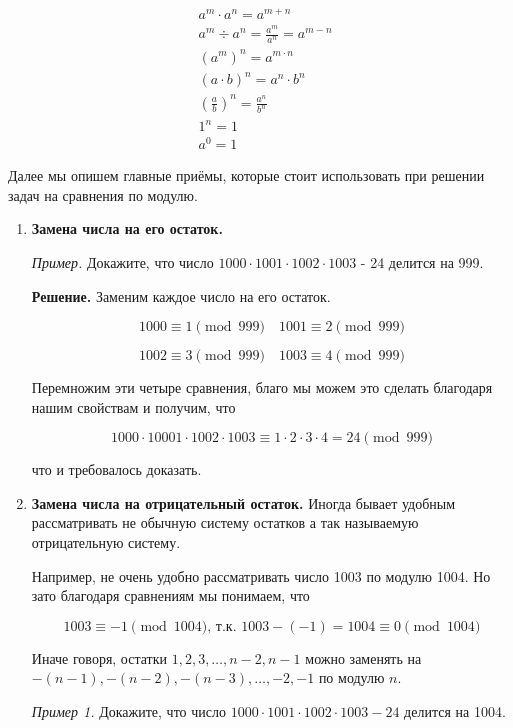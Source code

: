$$
\begin{aligned}
& a^m \cdot a^n=a^{m+n} \\
& a^m \div a^n=\frac{a^m}{a^n}=a^{m-n} \\
& \left(a^m\right)^n=a^{m \cdot n} \\
& (a \cdot b)^n=a^n \cdot b^n \\
& \left(\frac{a}{b}\right)^n=\frac{a^n}{b^n} \\
& 1^n=1 \\
& a^0=1
\end{aligned}
$$

Далее мы опишем главные приёмы, которые стоит использовать при решении задач на сравнения по модулю.

\begin{enumerate}
    \item \textbf{Замена числа на его остаток.}
    
    \textit{Пример.} Докажите, что число $1000 \cdot 1001 \cdot 1002 \cdot 1003$ - 24 делится на 999.

    \textbf{Решение.} Заменим каждое число на его остаток. 

    $$
    1000 \equiv 1 \pmod{999} \quad 1001 \equiv 2 \pmod{999}
    $$

    $$
    1002 \equiv 3 \pmod{999} \quad 1003 \equiv 4 \pmod{999}
    $$
    
    Перемножим эти четыре сравнения, благо мы можем это сделать благодаря нашим свойствам и получим, что 

    $$
    1000\cdot10001\cdot1002\cdot1003 \equiv 1\cdot2\cdot3\cdot4 = 24 \pmod{999}
    $$
    
    что и требовалось доказать.

    \item \textbf{Замена числа на отрицательный остаток.}
    Иногда бывает удобным рассматривать не обычную систему остатков а так называемую отрицательную систему.

    Например, не очень удобно рассматривать число 1003 по модулю 1004. Но зато благодаря сравнениям мы понимаем, что 

    $$
    1003 \equiv -1 \pmod{1004} \text{, т.к. } 1003 - (-1) = 1004 \equiv 0 \pmod{1004}
    $$

    Иначе говоря, остатки $1, 2, 3, \ldots, n-2, n-1 $ можно заменять на $-(n-1), -(n-2), -(n-3), \ldots, -2, -1 $ по модулю $n$.
    
    \textit{Пример 1.}
    Докажите, что число $1000 \cdot 1001 \cdot 1002 \cdot 1003-24$ делится на 1004.


\end{enumerate}
